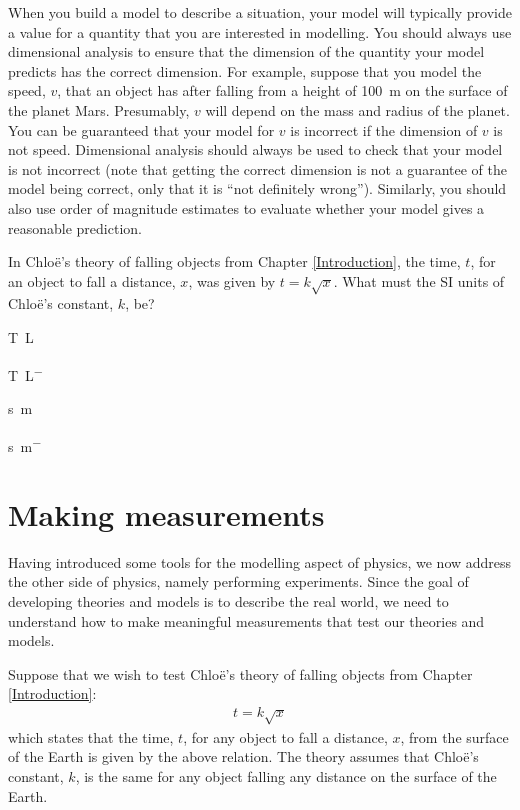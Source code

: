 When you build a model to describe a situation, your model will typically provide a value for a quantity that you are interested in modelling. You should always use dimensional analysis to ensure that the dimension of the quantity your model predicts has the correct dimension. For example, suppose that you model the speed, $v$, that an object has after falling from a height of \SI{100}{\meter} on the surface of the planet Mars. Presumably, $v$ will depend on the mass and radius of the planet. You can be guaranteed that your model for $v$ is incorrect if the dimension of $v$ is not speed. Dimensional analysis should always be used to check that your model is not incorrect (note that getting the correct dimension is not a guarantee of the model being correct, only that it is ``not definitely wrong''). Similarly, you should also use order of magnitude estimates to evaluate whether your model gives a reasonable prediction.

\begin{checkpoint}
\begin{MCquestion}{In Chlo\"e's theory of falling objects from Chapter \ref{Introduction}, the time, $t$, for an object to fall a distance, $x$, was given by $t=k\sqrt{x}$. What must the SI units of Chlo\"e's constant, $k$, be?}
\item \si{T.L^{}}
\item \si{T.L^{-}}
\item \si{s.m^{}}
\item \si{s.m^{-}} %
\end{MCquestion}
\end{checkpoint}

\section{Making measurements}
Having introduced some tools for the modelling aspect of physics, we now address the other side of physics, namely performing experiments. Since the goal of developing theories and models is to describe the real world, we need to understand how to make meaningful measurements that test our theories and models.

Suppose that we wish to test Chlo\"e's theory of falling objects from Chapter \ref{Introduction}:
\begin{align*}
t=k\sqrt{x}
\end{align*}
which states that the time, $t$, for any object to fall a distance, $x$, from the surface of the Earth is given by the above relation. The theory assumes that Chlo\"e's constant, $k$, is the same for any object falling any distance on the surface of the Earth.

